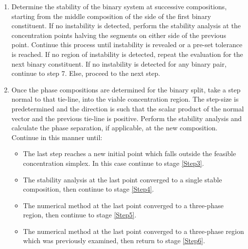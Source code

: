 \begin{enumerate}
\item Determine the stability of the binary system at successive compositions, starting from the middle composition of the side of the first binary constituent. If no instability is detected, perform the stability analysis at the concentration points halving the segments on either side of the previous point. Continue this process until instability is revealed or a pre-set tolerance is reached. If no region of instability is detected, repeat the evaluation for the next binary constituent. If no instability is detected for any binary pair, continue to step 7. Else, proceed to the next step.\label{Step1}\
\item Once the phase compositions are determined for the binary split, take a step normal to that tie-line, into the viable concentration region. The step-size is predetermined and the direction is such that the scalar product of the normal vector and the previous tie-line is positive. Perform the stability analysis and calculate the phase separation, if applicable, at the new composition. Continue in this manner until:\label{Step2}\

	\begin{itemize}
	\item The last step reaches a new initial point which falls outside the feasible concentration simplex. In this case continue to stage \ref{Step3}.\
	\item The stability analysis at the last point converged to a single stable composition, then continue to stage \ref{Step4}.\
	\item The numerical method at the last point converged to a three-phase region, then continue to stage \ref{Step5}.\
	\item The numerical method at the last point converged to a three-phase region which was previously examined, then return to stage \ref{Step6}.
	\end{itemize}


\end{enumerate}
